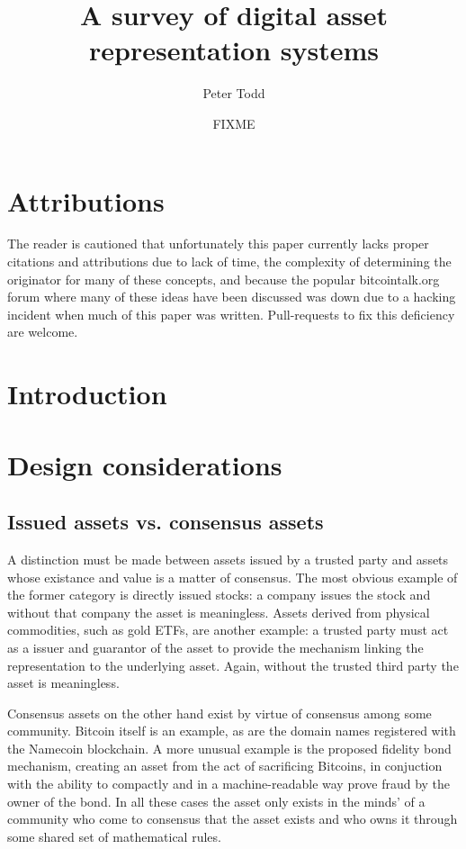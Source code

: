 \documentclass{article}
\begin{document}
\title{A survey of digital asset representation systems}
\author{Peter Todd}
\date{FIXME}
\maketitle

\section{Attributions}

The reader is cautioned that unfortunately this paper currently lacks proper
citations and attributions due to lack of time, the complexity of determining
the originator for many of these concepts, and because the popular
bitcointalk.org forum where many of these ideas have been discussed was down
due to a hacking incident when much of this paper was written. Pull-requests to
fix this deficiency are welcome.


\section{Introduction}

\section{Design considerations}

\subsection{Issued assets vs. consensus assets}

A distinction must be made between assets issued by a trusted party and assets
whose existance and value is a matter of consensus. The most obvious example of
the former category is directly issued stocks: a company issues the stock and
without that company the asset is meaningless. Assets derived from physical
commodities, such as gold ETFs, are another example: a trusted party must act
as a issuer and guarantor of the asset to provide the mechanism linking the
representation to the underlying asset.  Again, without the trusted third party
the asset is meaningless.

Consensus assets on the other hand exist by virtue of consensus among some
community. Bitcoin itself is an example, as are the domain names registered
with the Namecoin blockchain. A more unusual example is the proposed fidelity
bond mechanism, creating an asset from the act of sacrificing Bitcoins, in
conjuction with the ability to compactly and in a machine-readable way prove
fraud by the owner of the bond. In all these cases the asset only exists in the
minds' of a community who come to consensus that the asset exists and who owns
it through some shared set of mathematical rules.
\end{document}
